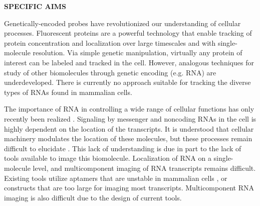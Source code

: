 

\noindent \begin{center}
{\bf SPECIFIC AIMS}
\end{center}

Genetically-encoded probes have revolutionized our understanding of cellular processes. Fluorescent proteins are a powerful technology that enable tracking of protein concentration and localization over large timescales and with single-molecule resolution. Via simple genetic manipulation, virtually any protein of interest can be labeled and tracked in the cell. However, analogous techniques for study of other biomolecules through genetic encoding (e.g. RNA)  are underdeveloped. There is currently no approach suitable for tracking the diverse types of RNAs found in mammalian cells. %

The importance of RNA in controlling a wide range of cellular functions has only recently been realized \cite{CechNoncodingRNARevolution2014}. Signaling by messenger and noncoding RNAs in the cell is highly dependent on the location of the transcripts. It is understood that cellular machinery modulates the location of these molecules, but these processes remain difficult to elucidate \cite{Muller-McNicollHowcellsget2013a}.
This lack of understanding is due in part to the lack of tools available to image this biomolecule. Localization of RNA on a single-molecule level, and multicomponent imaging of RNA transcripts remains difficult. Existing tools utilize aptamers that are unstable in mammalian cells \cite{EtzelSyntheticRiboswitchesPlug2017}, or constructs that are too large for imaging most transcripts. Multicomponent RNA imaging is also difficult due to the design of current tools.

